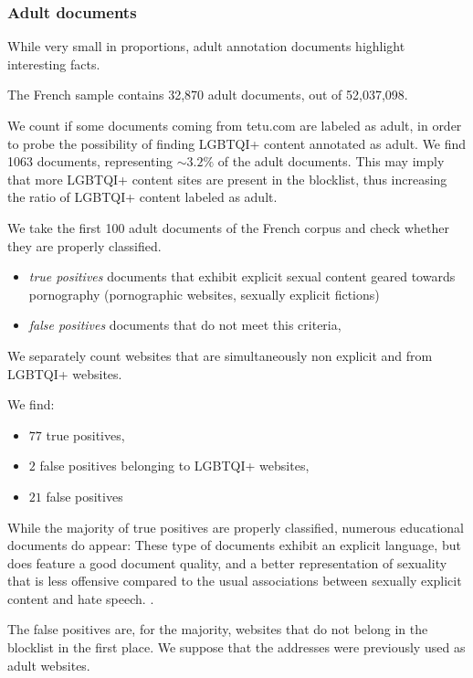 \subsubsection{Adult documents}

While very small in proportions, adult annotation documents highlight interesting facts.

The French sample contains 32,870 adult documents, out of 52,037,098.

We count if some documents coming from tetu.com are labeled as adult, in order to probe the possibility of finding LGBTQI+ content annotated as adult. We find 1063 documents, representing $\sim 3.2\%$ of the adult documents. This may imply that more LGBTQI+ content sites are present in the blocklist, thus increasing the ratio of LGBTQI+ content labeled as adult.

We take the first 100 adult documents of the French corpus and check whether they are properly classified.
\begin{itemize}
    \item \emph{true positives} documents that exhibit explicit sexual content geared towards pornography (pornographic websites, sexually explicit fictions)
    \item \emph{false positives} documents that do not meet this criteria,
\end{itemize}

We separately count websites that are simultaneously non explicit and from LGBTQI+ websites.

We find:
\begin{itemize}
    \item $77$ true positives,
    \item $2$ false positives belonging to LGBTQI+ websites,
    \item $21$ false positives
\end{itemize}

While the majority of true positives are properly classified, numerous educational documents do appear: These type of documents exhibit an explicit language, but does feature a good document quality, and a better representation of sexuality that is less offensive compared to the usual associations between sexually explicit content and hate speech.  \cite{luccioni-viviano-2021-whats}.

The false positives are, for the majority, websites that do not belong in the blocklist in the first place. We suppose that the addresses were previously used as adult websites.



